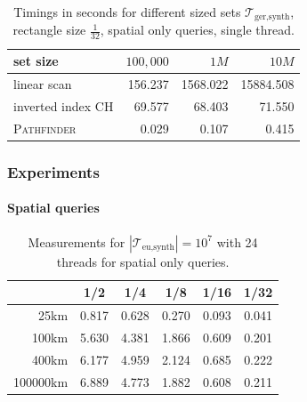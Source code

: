 \documentclass{beamer}
\newcommand{\pathfinder}{\textsc{Pathfinder}\xspace}
\newcommand{\traj}[2]{\mathcal{T}_{\text{#1},\text{#2}}}
\begin{document}
\begin{table}
	{
		\caption[Messungen$germany\_real\_1_naive_variants_threadripper$]{Timings in seconds for different sized sets $\traj{ger}{synth}$, rectangle size $\frac{1}{32}$, spatial only queries, single thread.
		}
		\begin{tabular}{|l||r|r|r|}
			\hline
			set size          & $100,000$ & $1 M$    & $10 M$
			\\ \hline
			linear scan       & 156.237   & 1568.022 & 15884.508 \\
			inverted index CH & 69.577    & 68.403   & 71.550    \\
			\pathfinder       & 0.029     & 0.107    & 0.415     \\
			\hline
		\end{tabular}
	}
\end{table}

\begin{frame}
	\frametitle{Experiments}
	\framesubtitle{Spatial queries}
	\begin{table}
		\caption[Messungen$europe\_10\_24_spatial_nekton$]{Measurements  for $|\traj{eu}{synth}| = 10^7$ with 24 threads for spatial only queries.}


		\footnotesize
		\centering
		\begin{tabular}{|r||c|c|c|c|c|}
			\hline
			\diagbox[width=40pt]{d}{} & 1/2   & 1/4   & 1/8   & 1/16  & 1/32
			\\\hline
			25km                      & 0.817 & 0.628 & 0.270 & 0.093 & 0.041 \\
			100km                     & 5.630 & 4.381 & 1.866 & 0.609 & 0.201 \\
			400km                     & 6.177 & 4.959 & 2.124 & 0.685 & 0.222 \\
			100000km                  & 6.889 & 4.773 & 1.882 & 0.608 & 0.211 \\
			\hline
		\end{tabular}
	\end{table}
\end{frame}
\end{document}
